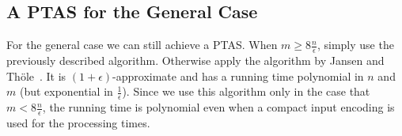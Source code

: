 \subsection{A PTAS for the General Case}

For the general case we can still achieve a PTAS.
When $m \geq 8 \frac{n}{\epsilon}$, simply use the previously described algorithm.
Otherwise apply the algorithm by Jansen and Thöle~\cite{jansen10}.
It is $(1 + \epsilon)$-approximate and has a running time polynomial in $n$ and $m$ (but exponential in $\frac{1}{\epsilon}$).
Since we use this algorithm only in the case that $m < 8 \frac{n}{\epsilon}$,
the running time is polynomial even when a compact input encoding is used for the processing times.